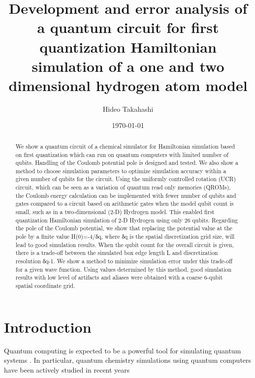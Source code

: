 \documentclass[A4]{article}
\begin{document}
\title{Development and error analysis of
a quantum circuit for first quantization Hamiltonian simulation 
of a one and two dimensional hydrogen atom model }
\author{Hideo Takahashi}
\date{\today}
\maketitle
\begin{abstract}
We show a quantum circuit of a chemical simulator for Hamiltonian simulation
based on first quantization which can run on quantum computers with limited
number of qubits. Handling of the Coulomb potential pole is designed and tested.
We also show a method to choose simulation parameters to optimize simulation
accuracy within a given number of qubits for the circuit. Using the uniformly
controlled rotation (UCR) circuit, which can be seen as a variation of quantum
read only memories (QROMs), the Coulomb energy calculation can be implemented
with fewer number of qubits and gates compared to a circuit based on arithmetic
gates when the model qubit count is small, such as in a two-dimensional (2-D)
Hydrogen model.  This enabled first quantization Hamiltonian simulation of 2-D
Hydrogen using only 26 qubits.  Regarding the pole of the Coulomb potential, we
show that replacing the potential value at the pole by a finite value
H(0)=-4/δq, where δq is the spatial discretization grid size, will lead to good
simulation results. When the qubit count for the overall circuit is given, there
is a trade-off between the simulated box edge length L and discretization
resolution δq-1. We show a method to minimize simulation error under this
trade-off for a given wave function.  Using values determined by this method,
good simulation results with low level of artifacts and aliases were obtained
with a coarse 6-qubit spatial coordinate grid.
\end{abstract}

\section{Introduction}
Quantum computing is expected to be a powerful tool for simulating quantum
systems \cite{feynman1982simulating,AbramsAndLloyd1997.PhysRevLett.79.2586}. In particular, quantum chemistry
simulations using quantum computers have been actively studied in recent years
\end{document}
